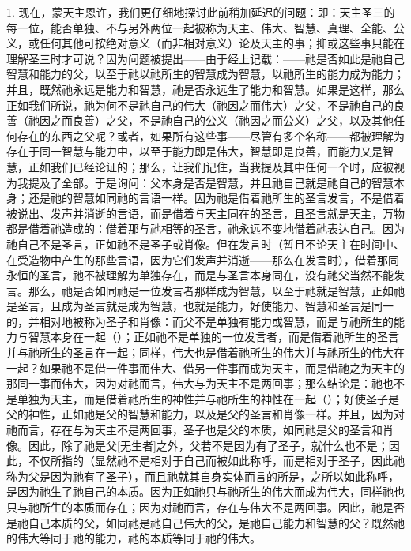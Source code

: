 1. 现在，蒙天主恩许，我们更仔细地探讨此前稍加延迟的问题：即：天主圣三的每一位，能否单独、不与另外两位一起被称为天主、伟大、智慧、真理、全能、公义，或任何其他可按绝对意义（而非相对意义）论及天主的事；抑或这些事只能在理解圣三时才可说？因为问题被提出——由于经上记载：——祂是否如此是祂自己智慧和能力的父，以至于祂以祂所生的智慧成为智慧，以祂所生的能力成为能力；并且，既然祂永远是能力和智慧，祂是否永远生了能力和智慧。如果是这样，那么正如我们所说，祂为何不是祂自己的伟大（祂因之而伟大）之父，不是祂自己的良善（祂因之而良善）之父，不是祂自己的公义（祂因之而公义）之父，以及其他任何存在的东西之父呢？或者，如果所有这些事——尽管有多个名称——都被理解为存在于同一智慧与能力中，以至于能力即是伟大，智慧即是良善，而能力又是智慧，正如我们已经论证的；那么，让我们记住，当我提及其中任何一个时，应被视为我提及了全部。于是询问：父本身是否是智慧，并且祂自己就是祂自己的智慧本身；还是祂的智慧如同祂的言语一样。因为祂是借着祂所生的圣言发言，不是借着被说出、发声并消逝的言语，而是借着与天主同在的圣言，且圣言就是天主，万物都是借着祂造成的：借着那与祂相等的圣言，祂永远不变地借着祂表达自己。因为祂自己不是圣言，正如祂不是圣子或肖像。但在发言时（暂且不论天主在时间中、在受造物中产生的那些言语，因为它们发声并消逝——那么在发言时），借着那同永恒的圣言，祂不被理解为单独存在，而是与圣言本身同在，没有祂父当然不能发言。那么，祂是否如同祂是一位发言者那样成为智慧，以至于祂就是智慧，正如祂是圣言，且成为圣言就是成为智慧，也就是能力，好使能力、智慧和圣言是同一的，并相对地被称为圣子和肖像：而父不是单独有能力或智慧，而是与祂所生的能力与智慧本身在一起（）；正如祂不是单独的一位发言者，而是借着祂所生的圣言并与祂所生的圣言在一起；同样，伟大也是借着祂所生的伟大并与祂所生的伟大在一起？如果祂不是借一件事而伟大、借另一件事而成为天主，而是借祂之为天主的那同一事而伟大，因为对祂而言，伟大与为天主不是两回事；那么结论是：祂也不是单独为天主，而是借着祂所生的神性并与祂所生的神性在一起（）；好使圣子是父的神性，正如祂是父的智慧和能力，以及是父的圣言和肖像一样。并且，因为对祂而言，存在与为天主不是两回事，圣子也是父的本质，如同祂是父的圣言和肖像。因此，除了祂是父[无生者]之外，父若不是因为有了圣子，就什么也不是；因此，不仅所指的（显然祂不是相对于自己而被如此称呼，而是相对于圣子，因此祂称为父是因为祂有了圣子），而且祂就其自身实体而言的所是，之所以如此称呼，是因为祂生了祂自己的本质。因为正如祂只与祂所生的伟大而成为伟大，同样祂也只与祂所生的本质而存在；因为对祂而言，存在与伟大不是两回事。因此，祂是否是祂自己本质的父，如同祂是祂自己伟大的父，是祂自己能力和智慧的父？既然祂的伟大等同于祂的能力，祂的本质等同于祂的伟大。\par

